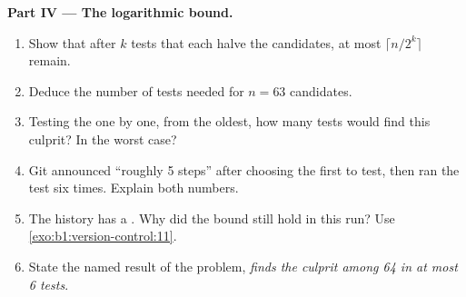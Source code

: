 \begin{problem}
\medskip\noindent\textbf{Part IV --- The logarithmic bound.}
\begin{enumerate}[resume]
\item Show that after $k$ tests that each halve the candidates, at most $\lceil n / 2^k \rceil$ remain.
\item Deduce the number of tests needed for $n = 63$ candidates.
\item Testing the  one by one, from the oldest, how many tests would find this culprit? In the worst case?
\item Git announced ``roughly 5 steps'' after choosing the first  to test, then ran the test six times. Explain
both numbers.
\item The history has a . Why did the bound still hold in this run? Use \cref{exo:b1:version-control:11}.
\item State the named result of the problem, \emph{ finds the culprit among 64  in at most 6 tests}.
\end{enumerate}
\end{problem}
